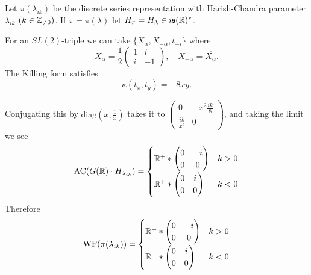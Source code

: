 \documentclass{article}
\theoremstyle{definition}
\numberwithin{equation}{section}
\renewcommand{\-}{\hyp{}}
\newcommand{\s}{\mathfrak s}
\newcommand{\WF}{\mathrm{WF}}
\newcommand{\AC}{\mathrm{AC}}
\begin{document}
Let $\pi(\lambda_{ik})$ be the discrete series representation with Harish-Chandra parameter $\lambda_{ik}$ $(k\in \mathbb{Z}_{\ne 0})$.
If $\pi=\pi(\lambda)$ let $H_\pi=H_\lambda\in i\s(\R)^*$.

For an $SL(2)$-triple we can take $\{X_\alpha,X_{-\alpha},t_{-i}\}$ where
$$
X_\alpha=\frac12\begin{pmatrix}1&i\\i&-1
\end{pmatrix}, \quad X_{-\alpha}=\overline{X_\alpha}.
$$
The Killing form satisfies
$$
\kappa(t_x,t_y)=-8xy.
$$



Conjugating this by $\mathrm{diag}(x,\frac 1x)$ takes it to
$\begin{pmatrix}0&-x^2\frac{ik}8\\\frac{ik}{x^2}&0
\end{pmatrix}$,
and taking the limit we see
$$
\AC(G(\R)\cdot H_{\lambda_{ik}})=
\begin{cases}
  \R^+*\begin{pmatrix}0&-i\\0&0
  \end{pmatrix}&k>0\\
    \R^+*\begin{pmatrix}0&i\\0&0
  \end{pmatrix}&k<0\\
  \end{cases}
$$
Therefore
$$
\WF(\pi(\lambda_{ik}))
=
\begin{cases}
  \R^+*\begin{pmatrix}0&-i\\0&0
  \end{pmatrix}&k>0\\
    \R^+*\begin{pmatrix}0&i\\0&0
  \end{pmatrix}&k<0\\
  \end{cases}
$$
\end{document}
